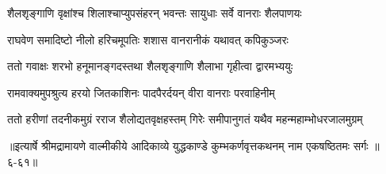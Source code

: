 \twolineshloka
{शैलशृङ्गाणि वृक्षांश्च शिलाश्चाप्युपसंहरन्}
{भवन्तः सायुधाः सर्वे वानराः शैलपाणयः} %

\twolineshloka
{राघवेण समादिष्टो नीलो हरिचमूपतिः}
{शशास वानरानीकं यथावत् कपिकुञ्जरः} %

\twolineshloka
{ततो गवाक्षः शरभो हनूमानङ्गदस्तथा}
{शैलशृङ्गाणि शैलाभा गृहीत्वा द्वारमभ्ययुः} %

\twolineshloka
{रामवाक्यमुपश्रुत्य हरयो जितकाशिनः}
{पादपैरर्दयन् वीरा वानराः परवाहिनीम्} %

\twolineshloka
{ततो हरीणां तदनीकमुग्रं रराज शैलोद्यतवृक्षहस्तम्}
{गिरेः समीपानुगतं यथैव महन्महाम्भोधरजालमुग्रम्} %


॥इत्यार्षे श्रीमद्रामायणे वाल्मीकीये आदिकाव्ये युद्धकाण्डे कुम्भकर्णवृत्तकथनम् नाम एकषष्ठितमः सर्गः ॥६-६१॥
